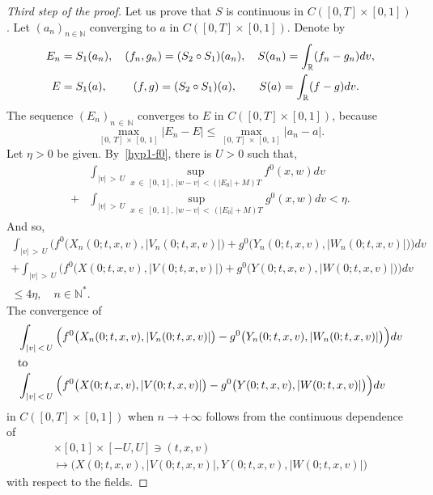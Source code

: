 \documentclass[10pt]{amsart}
\theoremstyle{definition}\newtheorem{defi}[theo]{Definition}\newtheorem{rema}[theo]{Remark}\newtheorem{exam}[theo]{Example}\newtheorem{exem}[theo]{Example}\newtheorem{nota}[theo]{Notation}
\newcommand{\R}{\mathbb{R}}
\newcommand{\N}{\mathbb{N}}
\begin{document}
\begin{proof}[{Third step of the proof}]
Let us prove that $S$ is continuous in $C([0,T] \times [0,1])$. Let $(a_n)_{n\in \N }$ converging to $a$ in $C([0,T] \times [0,1])$. Denote by
\begin{align*}
E_n &= S_1(a_n), \quad (f_n,g_n) = (S_2 \circ S_1) (a_n), \quad S(a_n) = \int_{\R } (f_n-g_n)dv,\\
E &= S_1(a),\mkern41mu (f,g) = (S_2 \circ S_1)(a), \mkern35mu S(a) = \int_{\R } (f-g)dv.
\end{align*}
The sequence $(E_n)_{n\,\in\,\N}$ converges to $E$ in $C([0,T] \times [0,1])$, because
\[
\max_{[0,\,T]\,\times\,[0,\,1]} \left|E_n-E\right| \leq \max_{[0,\,T]\,\times\,[0,\,1]} \left|a_n-a\right|.
\]
Let $\eta>0$ be given. By~\eqref{hyp1-f0}, there is $U>0$ such that,
\begin{align*}
&\int_{|v|\,>\,U} \sup_{x\,\in\,[0,\,1],\,|w-v|\,<\left(\left|E_0\right|+M\right)T} f^0(x,w)dv \\
+ &\int_{|v|\,>\,U} \sup_{x\,\in\,[0,\,1],\,|w-v|\,<\,\left(\left|E_0\right|+M\right)T} g^0(x,w)dv < \eta.
\end{align*}
And so,
\begin{multline*}
\int_{|v|\,>\,U} \Big(f^0\big(X_n(0;t,x,v),\lvert V_n(0;t,x,v)\rvert\big)+g^0\big(Y_n(0;t,x,v),\lvert W_n(0;t,x,v)\rvert\big)\Big) dv\\
+\int_{|v|\,>\,U} \Big(f^0\big(X(0;t,x,v),\lvert V(0;t,x,v)\rvert\big)+g^0\big(Y(0;t,x,v),\lvert W(0;t,x,v)\rvert\big)\big) dv\\
\leq 4\eta,\quad n\in \N ^*.
\end{multline*}
The convergence of
\begin{align*}
&\int_{|v|\,<\,U} \Big(f^0\big(X_n(0;t,x,v),|V_n(0;t,x,v)|\big)-g^0\big(Y_n(0;t,x,v),|W_n(0;t,x,v)|\big)\Big) dv
\\
\intertext{to}
&\int_{|v|\,<\,U} \Big(f^0\big(X(0;t,x,v),|V(0;t,x,v)|\big)-g^0\big(Y(0;t,x,v),|W(0;t,x,v)|\big)\Big) dv
\end{align*}
in $C([0,T] \times [0,1])$ when $n \to +\infty $ follows from the continuous dependence of
\begin{multline*}
[0,T] \times [0,1] \times [-U,U] \ni (t,x,v)\\ \mapsto \big(X(0;t,x,v),|V(0;t,x,v)|,Y(0;t,x,v),|W(0;t,x,v)|\big)
\end{multline*}
with respect to the fields.
\end{proof}
\end{document}
